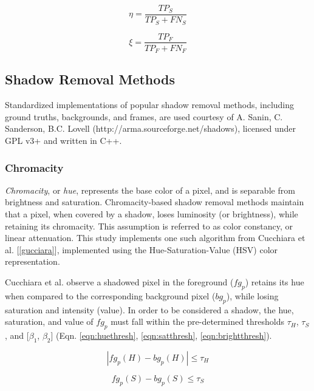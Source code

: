 \documentclass[12pt]{report}
\begin{document}
\begin{equation}
\eta = \dfrac{TP_{S}}{TP_{S} + FN_{S}} \label{eqn:detection}
\end{equation}

\begin{equation}
\xi = \dfrac{TP_{F}}{TP_{F} + FN_{F}} \label{eqn:discrimination}
\end{equation}

\subsection{Shadow Removal Methods} \label{section:removalmethods}

Standardized implementations of popular shadow removal methods, including ground truths, backgrounds, and frames, are used courtesy of A. Sanin, C. Sanderson, B.C. Lovell (http://arma.sourceforge.net/shadows), licensed under GPL v3+ and written in C++.

\subsubsection{Chromacity}

\textit{Chromacity}, or \textit{hue}, represents the base color of a pixel, and is separable from brightness and saturation. Chromacity-based shadow removal methods maintain that a pixel, when covered by a shadow, loses luminosity (or brightness), while retaining its chromacity. This assumption is referred to as  color constancy, or linear attenuation. This study implements one such algorithm from Cucchiara et al. [\ref{gucciara}], implemented using the Hue-Saturation-Value (HSV) color representation. 

Cucchiara et al. observe a shadowed pixel in the foreground ($fg_{p}$) retains its hue when compared to the corresponding background pixel ($bg_{p}$), while losing saturation and intensity (value). In order to be considered a shadow, the hue, saturation, and value of $fg_{p}$ must fall within the pre-determined thresholds $\tau_{H}$, $\tau_{S}$, and [$\beta_{1}$, $\beta_{2}$] (Eqn. \ref{eqn:huethresh}, \ref{eqn:satthresh}, \ref{eqn:brightthresh}).

\begin{equation} \label{eqn:huethresh}
| fg_{p}(H) - bg_{p}(H) | \leq \tau_{H}
\end{equation}

\begin{equation} \label{eqn:satthresh}
fg_{p}(S) - bg_{p}(S) \leq \tau_{S}
\end{equation}
\end{document}
